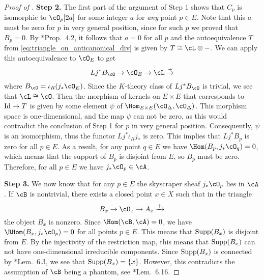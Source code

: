 \begin{proof}[Proof of ]
\smallskip
{\bf Step 2.}
The first part of the argument of Step 1 shows that $C_p$ is isomorphic to $\cO_p[2a]$ for some integer $a$ for \emph{any} point $p\in E$. Note that this $a$ must be zero for $p$ in very general position, since for such $p$ we proved that $B_p=0$. By \cite{HVdB07}*{Prop.~4.2}, it follows that $a=0$ for all $p$ and the autoequivalence $T$ from \eqref{eq:triangle_on_anticanonical_div} is given by $T \cong \cL \otimes -$. We can apply this autoequivalence to $\cO_E$ to get
\[
Lj^\ast B_{\cO} \to \cO_E\to \cL\stackrel {+}{\to}
\]
where $ B_{\cO} = \iota_R (j_\ast\cO_E)$. Since the $K$-theory class of $Lj^\ast B_{\cO}$ is trivial, we see that $\cL\cong \cO$. Then the morphism of kernels on $E\times E$ that corresponds to ${\rm Id}\to T$ is given by some element $\psi$ of $\Hom_{E\times E}(\cO_\Delta,\cO_\Delta)$. This morphism space is one-dimensional, and the map $\psi$ can not be zero, as this would contradict the conclusion of Step 1 for $p$ in very general position. Consequently, $\psi$  is an isomorphism, thus the functor $Lj^\ast \iota_R j_\ast $ is zero. This implies that $Lj^\ast B_p$ is zero for all $p\in E$. As a result, for any point $q\in E$ we have $\Hom(B_p,j_\ast \cO_q)=0$, which means that the support of $B_p$ is disjoint from $E$, so $B_p$ must be zero. Therefore, for all $p\in E$ we have  $j_\ast \cO_p\in \cA$. 

\smallskip
{\bf Step 3.} We now know that for any $p\in E$ the skyscraper sheaf $j_\ast \cO_p$ lies in $\cA$. If $\cB$ is nontrivial, there exists a closed point $x\in X$ such that in the triangle
\[
B_x\to \cO_x \to A_x \xrightarrow{+   }
\]
the object $B_x$ is nonzero. Since $\Hom(\cB,\cA)=0$, we have 
$\RHom(B_x,j_\ast\cO_p)=0$ for all points $p\in E$. This means that ${\rm Supp}(B_x)$ is disjoint from $E$. By the injectivity of the restriction map, this means that ${\rm Supp}(B_x)$ can not have one-dimensional irreducible components. Since ${\rm Supp}(B_x)$ is connected by \cite{P23}*{Lem.~6.3}, we see that ${\rm Supp}(B_x)=\{x\}$. However, this contradicts the assumption of $\cB$ being a phantom, see \cite{P23}*{Lem.~6.16}.
\end{proof}


{}



